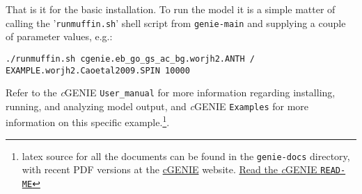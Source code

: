 \documentclass[10pt,twoside]{article}
\begin{document}
\noindent That is it for the basic installation. To run the model it
is a simple matter of calling the '\texttt{runmuffin.sh}' shell script
from \texttt{genie-main} and supplying a couple of parameter values,
e.g.:
\vspace{-5pt}\small
\begin{verbatim}
./runmuffin.sh cgenie.eb_go_gs_ac_bg.worjh2.ANTH / EXAMPLE.worjh2.Caoetal2009.SPIN 10000
\end{verbatim}\normalsize\vspace{-5pt} Refer to the
\textit{c}GENIE \texttt{User\_manual} for more information regarding
installing, running, and analyzing model output, and \textit{c}GENIE
\texttt{Examples} for more information on this specific
example.\footnote{latex source for all the documents can be found in
  the \texttt{genie-docs} directory, with recent PDF versions at the
  \href{www.seao2.info/mycgenie.html.}{cGENIE} website. \uline{Read
    the \textit{c}GENIE \texttt{READ-ME}}}.

  
\end{document}
